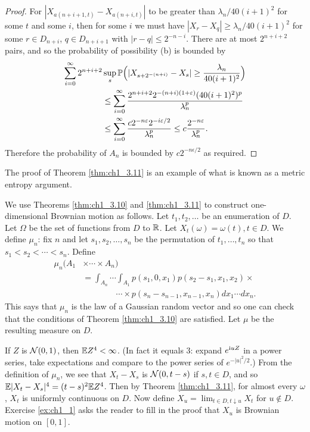 \begin{proof}
For $|X_{a(n+i+1,t)} - X_{a(n+i,t)}|$ to be greater than $\lambda_n/40(i+1)^2$ for some $t$ and some $i$, then for some $i$ we must have $|X_r - X_q| \geq \lambda_n/40(i+1)^2$ for some $r \in D_{n+i}$, $q \in D_{n+i+1}$ with $|r-q| \leq 2^{-n-i}$. There are at most $2^{n+i+2}$ pairs, and so the probability of possibility (b) is bounded by
\begin{align*}
    \sum_{i=0}^\infty 2^{n+i+2}&\sup_s \P\Big(|X_{s+2^{-(n+i)}} - X_s| \geq \frac{\lambda_n}{40(i+1)^2}\Big) \\
    &\leq \sum_{i=0}^\infty \frac{2^{n+i+2}2^{-(n+i)(1+\epsilon)}(40(i+1)^2)^p}{\lambda_n^p} \\
    &\leq \sum_{i=0}^\infty \frac{c2^{-n\epsilon}2^{-i\epsilon/2}}{\lambda_n^p} \leq c\frac{2^{-n\epsilon}}{\lambda_n^p}.
\end{align*}
Therefore the probability of $A_n$ is bounded by $c2^{-n\epsilon/2}$ as required.
\end{proof}


The proof of Theorem \ref{thm:ch1_3.11} is an example of what is known as a metric entropy argument.

We use Theorems \ref{thm:ch1_3.10} and \ref{thm:ch1_3.11} to construct one-dimensional Brownian motion as follows. Let $t_1,t_2,\ldots$ be an enumeration of $D$. Let $\Omega$ be the set of functions from $D$ to $\R$. Let $X_t(\omega) = \omega(t), t \in D$. We define $\mu_n$: fix $n$ and let $s_1,s_2,\ldots,s_n$ be the permutation of $t_1,\ldots,t_n$ so that $s_1 < s_2 < \cdots < s_n$. Define
\begin{align*}
    \mu_n(A_1 &\times \cdots \times A_n) \\
    &= \int_{A_n} \cdots \int_{A_1} p(s_1,0,x_1)p(s_2-s_1,x_1,x_2)\times \\
    &\qquad\qquad\cdots \times p(s_n - s_{n-1},x_{n-1},x_n)dx_1\cdots dx_n.
\end{align*}
This says that $\mu_n$ is the law of a Gaussian random vector and so one can check that the conditions of Theorem \ref{thm:ch1_3.10} are satisfied. Let $\mu$ be the resulting measure on $D$.

If $Z$ is $\NC(0,1)$, then $\E Z^4 < \infty$. (In fact it equals 3: expand $e^{\im uZ}$ in a power series, take expectations and compare to the power series of $e^{-|u|^2/2}$.) From the definition of $\mu_n$, we see that $X_t - X_s$ is $\NC(0,t-s)$ if $s,t \in D$, and so $\E|X_t - X_s|^4 = (t-s)^2\E Z^4$. Then by Theorem \ref{thm:ch1_3.11}, for almost every $\omega$, $X_t$ is uniformly continuous on $D$. Now define $X_u = \lim_{t\in D,t\downarrow u} X_t$ for $u\notin D$. Exercise \ref{ex:ch1_1} asks the reader to fill in the proof that $X_u$ is Brownian motion on $[0,1]$.

